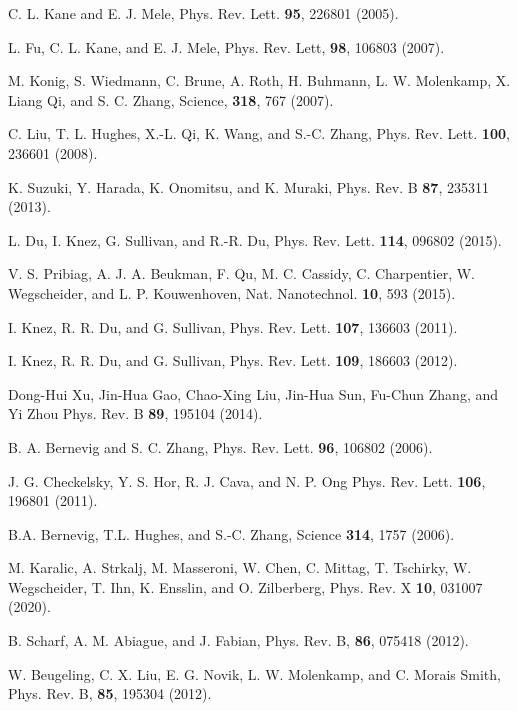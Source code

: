 \documentclass[prb,twocolumn]{revtex4-1}
\begin{document}
\begin{thebibliography}{55}
	
C. L. Kane and E. J. Mele, Phys. Rev. Lett. \textbf{95}, 226801 (2005).

L. Fu, C. L. Kane, and E. J. Mele,
Phys. Rev. Lett, \textbf{98}, 106803 (2007).

M. Konig, S. Wiedmann, C. Brune, A. Roth, H. Buhmann, L. W. Molenkamp, X. Liang Qi, and S. C. Zhang,
Science, \textbf{318}, 767 (2007).

	
C. Liu, T. L. Hughes, X.-L. Qi, K. Wang, and S.-C. Zhang, Phys. Rev. Lett. \textbf{100}, 236601 (2008).

K. Suzuki, Y. Harada, K. Onomitsu, and K. Muraki, Phys. Rev. B \textbf{87}, 235311 (2013).

L. Du, I. Knez, G. Sullivan, and R.-R. Du, Phys. Rev. Lett. \textbf{114}, 096802 (2015).

V. S. Pribiag, A. J. A. Beukman, F. Qu, M. C. Cassidy, C. Charpentier, W. Wegscheider, and L. P. Kouwenhoven, Nat. Nanotechnol. \textbf{10}, 593 (2015).

I. Knez, R. R. Du, and G. Sullivan, Phys. Rev. Lett. \textbf{107}, 136603
(2011).

I. Knez, R. R. Du, and G. Sullivan, Phys. Rev. Lett. \textbf{109}, 186603
(2012).


Dong-Hui Xu, Jin-Hua Gao, Chao-Xing Liu, Jin-Hua Sun, Fu-Chun Zhang, and Yi Zhou
Phys. Rev. B \textbf{89}, 195104 (2014).

B. A. Bernevig and S. C. Zhang, Phys. Rev. Lett. \textbf{96}, 106802
(2006).

J. G. Checkelsky, Y. S. Hor, R. J. Cava, and N. P. Ong
Phys. Rev. Lett. \textbf{106}, 196801 (2011).

B.A. Bernevig, T.L. Hughes, and S.-C. Zhang, 	Science \textbf{314}, 1757 (2006).

M. Karalic, A. Strkalj, M. Masseroni, W. Chen, C. Mittag, T. Tschirky,
W. Wegscheider, T. Ihn, K. Ensslin, and O. Zilberberg, Phys. Rev. X \textbf{10}, 031007 (2020).




B. Scharf, A. M. Abiague, and J. Fabian, Phys. Rev. B, \textbf{86}, 075418 (2012).


W. Beugeling, C. X. Liu, E. G. Novik, L. W. Molenkamp,
and C. Morais Smith, Phys. Rev. B, \textbf{85}, 195304 (2012).


\end{thebibliography}
\end{document}
